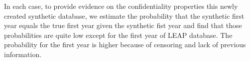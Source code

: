In each case, to provide evidence on the confidentiality properties this newly created  synthetic database, we estimate the probability that the synthetic first year equals the true first year given the synthetic fist year and find that those probabilities are quite low except for the first year of LEAP database. The probability for the first year is higher because of censoring and lack of previous information.

